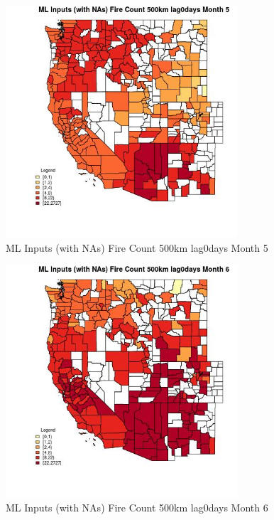 \clearpage 

\begin{figure} 
\centering  
\includegraphics[width=0.77\textwidth]{Code_Outputs/Report_ML_input_PM25_Step4_part_f_de_duplicated_aves_prioritize_24hr_obswNAs_CountyFire_Count_500km_lag0daysmedianMonth5.jpg} 
\caption{\label{fig:Report_ML_input_PM25_Step4_part_f_de_duplicated_aves_prioritize_24hr_obswNAsCountyFire_Count_500km_lag0daysmedianMonth5}ML Inputs (with NAs) Fire Count 500km lag0days Month 5} 
\end{figure} 
 

\begin{figure} 
\centering  
\includegraphics[width=0.77\textwidth]{Code_Outputs/Report_ML_input_PM25_Step4_part_f_de_duplicated_aves_prioritize_24hr_obswNAs_CountyFire_Count_500km_lag0daysmedianMonth6.jpg} 
\caption{\label{fig:Report_ML_input_PM25_Step4_part_f_de_duplicated_aves_prioritize_24hr_obswNAsCountyFire_Count_500km_lag0daysmedianMonth6}ML Inputs (with NAs) Fire Count 500km lag0days Month 6} 
\end{figure} 
 

